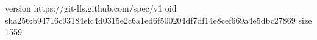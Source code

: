 version https://git-lfs.github.com/spec/v1
oid sha256:b94716c93184efc4d0315e2c6a1ed6f500204df7df14e8cef669a4e5dbc27869
size 1559
